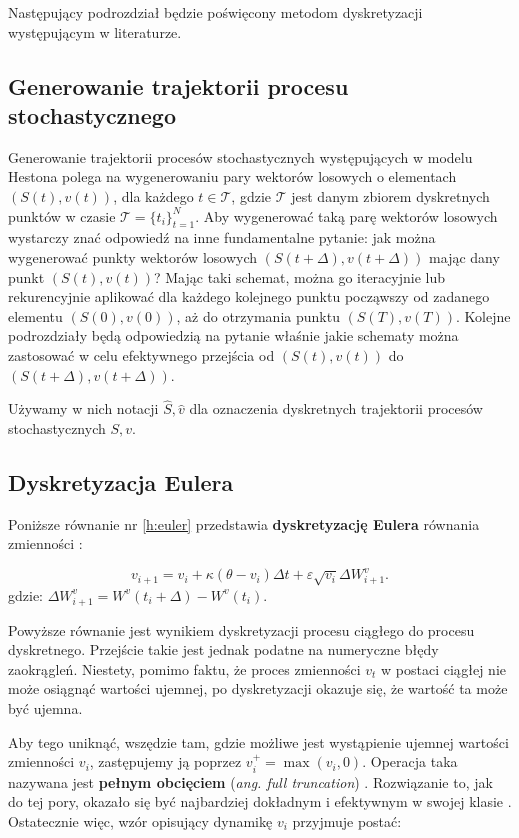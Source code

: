 \documentclass{pracamgr}
\begin{document}
Następujący podrozdział będzie poświęcony metodom dyskretyzacji występującym w literaturze.

\subsection{Generowanie trajektorii procesu stochastycznego}
Generowanie trajektorii procesów stochastycznych występujących w modelu Hestona polega na
wygenerowaniu pary wektorów losowych o elementach $(S(t), v(t))$, dla każdego $t \in \mathscr{T}$, 
gdzie $\mathscr{T}$ jest danym zbiorem dyskretnych punktów w czasie 
$\mathscr{T}  = \{t_i\}^N_{t=1}$. Aby wygenerować taką parę wektorów losowych wystarczy znać 
odpowiedź na inne fundamentalne pytanie: jak można wygenerować punkty wektorów losowych 
$(S(t+ \Delta), v(t+ \Delta))$
mając dany punkt $(S(t), v(t))$? Mając taki schemat, można go iteracyjnie lub rekurencyjnie aplikować 
dla każdego kolejnego punktu począwszy od zadanego elementu $(S(0), v(0))$, 
aż do otrzymania punktu $(S(T), v(T))$.
Kolejne podrozdziały będą odpowiedzią na pytanie właśnie jakie schematy można zastosować w celu 
efektywnego przejścia od $(S(t), v(t))$ do $(S(t+ \Delta), v(t+ \Delta))$.

Używamy w nich notacji $\hat{S}, \hat{v}$ dla oznaczenia dyskretnych trajektorii procesów 
stochastycznych $S, v$.

\subsection{Dyskretyzacja Eulera}

Poniższe równanie nr \ref{h:euler} przedstawia \textbf{dyskretyzację Eulera} równania 
zmienności \cite{Broadie}:
 
\begin{equation}\label{h:euler}
v_{i+1}  = v_i + \kappa (\theta - v_i) \Delta t + \varepsilon  \sqrt{v_i} \Delta W^{v}_{i+1}.
\end{equation}
gdzie: $\Delta W^{v}_{i+1} = W^{v} (t_i+\Delta) - W^{v} (t_i)$.

Powyższe równanie jest wynikiem dyskretyzacji procesu ciągłego do procesu dyskretnego. Przejście
takie jest jednak podatne na numeryczne błędy zaokrągleń. Niestety, pomimo faktu, że 
proces zmienności $v_t$ w postaci ciągłej nie może osiągnąć wartości ujemnej, po 
dyskretyzacji okazuje się, że wartość ta może być ujemna. 

Aby tego uniknąć, wszędzie tam, gdzie możliwe jest wystąpienie ujemnej 
wartości zmienności $v_i$, zastępujemy ją poprzez $v_i^+ = \max(v_i, 0)$. Operacja taka nazywana jest 
\textbf{pełnym obcięciem} (\textit{ang. full truncation}) \cite{Lord}.
Rozwiązanie to, jak do tej pory, okazało się być najbardziej dokładnym i 
efektywnym w swojej klasie \cite{Malham}. Ostatecznie więc, wzór opisujący dynamikę $v_i$ przyjmuje 
postać:
\end{document}
